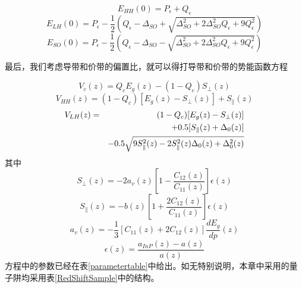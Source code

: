 \documentclass[oneside]{ZJUthesis}
\begin{document}
\begin{equation}
    E_{HH}(0) = P_{\epsilon} + Q_{\epsilon}
\end{equation}
\begin{equation}
    E_{LH}(0) = P_{\epsilon} - \frac{1}{2} \left( Q_{\epsilon} - \Delta_{SO} + \sqrt{\Delta^2_{SO} + 2 \Delta^2_{SO} Q_{\epsilon} + 9 Q^2_{\epsilon}} \right)
\end{equation}
\begin{equation}
    E_{SO}(0) = P_{\epsilon} - \frac{1}{2} \left( Q_{\epsilon} - \Delta_{SO} - \sqrt{\Delta^2_{SO} + 2 \Delta^2_{SO} Q_{\epsilon} + 9 Q^2_{\epsilon}} \right)
\end{equation}

最后，我们考虑导带和价带的偏置比，就可以得打导带和价带的势能函数方程

\begin{equation}
    \label{V_c}
    V_c(z) = Q_c E_g(z) - (1-Q_c)S_\perp(z)
\end{equation}
\begin{equation}
    \label{V_HH}
    V_{HH}(z) = (1-Q_c)[E_g(z) - S_\perp(z)] + S_\parallel(z)
\end{equation}
\begin{eqnarray}
    \label{V_LH}
    V_{LH}(z)&=& (1-Q_c)[E_g(z) - S_\perp(z)] \notag\\
    && +0.5[S_\parallel(z) + \Delta_0(z)] \notag\\
    && -0.5 \sqrt{9S_\parallel^2(z)-2S_\parallel^2(z)\Delta_0(z)+\Delta_0^2(z)}
\end{eqnarray}
其中
\begin{equation}
    \label{S_perp}
    S_\perp(z) = -2a_v(z)[1-\frac{C_{12}(z)}{C_{11}(z)}] \epsilon(z)
\end{equation}
\begin{equation}\label{S_parallel}
    S_\parallel(z) = -b(z)[1+\frac{2C_{12}(z)}{C_{11}(z)}] \epsilon(z)
\end{equation}
\begin{equation}\label{a_v}
    a_v(z) = -\frac{1}{3}[C_{11}(z)+2C_{12}(z)] \frac{dE_g}{dp}(z)
\end{equation}
\begin{equation}\label{epsilon}
    \epsilon(z) = \frac{a_{InP}(z)-a(z)}{a(z)}
\end{equation}
方程中的参数已经在表\ref{parametertable}中给出。如无特别说明，本章中采用的量子阱均采用表\ref{RedShiftSample}中的结构。
\end{document}
